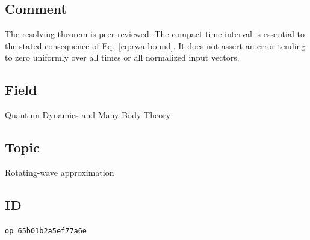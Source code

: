 \subsection*{Comment}

The resolving theorem is peer-reviewed.
The compact time interval is essential to the stated consequence of Eq.~\eqref{eq:rwa-bound}.
It does not assert an error tending to zero uniformly over all times or all normalized input vectors.

\subsection*{Field}

Quantum Dynamics and Many-Body Theory

\subsection*{Topic}

Rotating-wave approximation

\subsection*{ID}

\texttt{op\_65b01b2a5ef77a6e}
